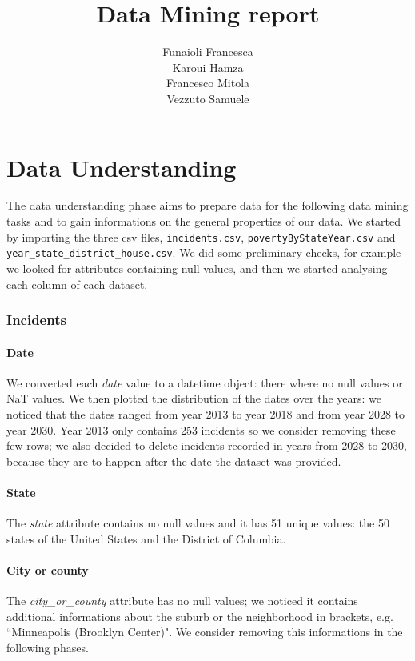 \documentclass[10pt,a4paper]{report}
\title{\huge{\textbf{Data Mining report}}}
\author{Funaioli Francesca\\
Karoui Hamza\\
Francesco Mitola\\
Vezzuto Samuele}
\begin{document}
\maketitle
\tableofcontents

\chapter{Data Understanding}

The data understanding phase aims to prepare data for the following data mining tasks and to gain informations on the general properties of our data.
We started by importing the three csv files, \texttt{incidents.csv}, \texttt{povertyByStateYear.csv} and \texttt{year\_state\_district\_house.csv}.
We did some preliminary checks, for example we looked for attributes containing null values, and then we started analysing each column of each dataset.

\subsection{Incidents}

\subsubsection{Date}

We converted each \textit{date} value to a datetime object: there where no null values or NaT values.
We then plotted the distribution of the dates over the years: we noticed that the dates ranged from year 2013 to year 2018 and from year 2028 to year 2030.
Year 2013 only contains 253 incidents so we consider removing these few rows; we also decided to delete incidents recorded in years from 2028 to 2030, because they are to happen after the date the dataset was provided.

\subsubsection{State}

The \textit{state} attribute contains no null values and it has 51 unique values: the 50 states of the United States and the District of Columbia.

\subsubsection{City or county}

The \textit{city\_or\_county} attribute has no null values; we noticed it contains additional informations about the suburb or the neighborhood in brackets, e.g. ``Minneapolis (Brooklyn Center)".
We consider removing this informations in the following phases.
\end{document}
